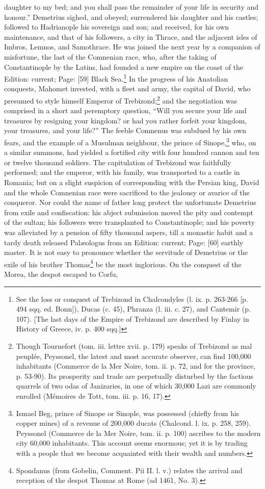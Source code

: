 daughter to my bed; and you shall pass the remainder of your life in security and honour.\texthebrew{}” Demetrius sighed, and obeyed; surrendered his daughter and his castles; followed to Hadrianople his sovereign and son; and received, for his own maintenance, and that of his followers, a city in Thrace, and the adjacent isles of Imbros, Lemnos, and Samothrace. He was joined the next year by a companion of misfortune, the last of the Comnenian race, who, after the taking of Constantinople by the Latins, had founded a new empire on the coast of the Edition: current; Page: [59] Black Sea.\footnote{See the loss or conquest of Trebizond in Chalcondyles (l. ix. p. 263-266 [p. 494 sqq. ed. Bonn]), Ducas (c. 45), Phranza (l. iii. c. 27), and Cantemir (p. 107). [The last days of the Empire of Trebizond are described by Finlay in History of Greece, iv. p. 400 sqq.]} In the progress of his Anatolian conquests, Mahomet invested, with a fleet and army, the capital of David, who presumed to style himself Emperor of Trebizond;\footnote{Though Tournefort (tom. iii. lettre xvii. p. 179) speaks of Trebizond as mal peuplée, Peyssonel, the latest and most accurate observer, can find 100,000 inhabitants (Commerce de la Mer Noire, tom. ii. p. 72, and for the province, p. 53-90). Its prosperity and trade are perpetually disturbed by the factious quarrels of two odas of Janizaries, in one of which 30,000 Lazi are commonly enrolled (Mémoires de Tott, tom. iii. p. 16, 17).} and the negotiation was comprised in a short and peremptory question, \texthebrew{“}Will you secure your life and treasures by resigning your kingdom? or had you rather forfeit your kingdom, your treasures, and your life?\texthebrew{}” The feeble Comnenus was subdued by his own fears, and the example of a Musulman neighbour, the prince of Sinope,\footnote{Ismael Beg, prince of Sinope or Sinople, was possessed (chiefly from his copper mines) of a revenue of 200,000 ducats (Chalcond. l. ix. p. 258, 259). Peyssonel (Commerce de la Mer Noire, tom. ii. p. 100) ascribes to the modern city 60,000 inhabitants. This account seems enormous; yet it is by trading with a people that we become acquainted with their wealth and numbers.} who, on a similar summons, had yielded a fortified city with four hundred cannon and ten or twelve thousand soldiers. The capitulation of Trebizond was faithfully performed; and the emperor, with his family, was transported to a castle in Romania; but on a slight suspicion of corresponding with the Persian king, David and the whole Comnenian race were sacrificed to the jealousy or avarice of the conqueror. Nor could the name of father long protect the unfortunate Demetrius from exile and confiscation: his abject submission moved the pity and contempt of the sultan; his followers were transplanted to Constantinople; and his poverty was alleviated by a pension of fifty thousand aspers, till a monastic habit and a tardy death released Palæologus from an Edition: current; Page: [60] earthly master. It is not easy to pronounce whether the servitude of Demetrius or the exile of his brother Thomas\footnote{Spondanus (from Gobelin, Comment. Pii II. l. v.) relates the arrival and reception of the despot Thomas at Rome (ad 1461, No. 3).} be the most inglorious. On the conquest of the Morea, the despot escaped to Corfu, 